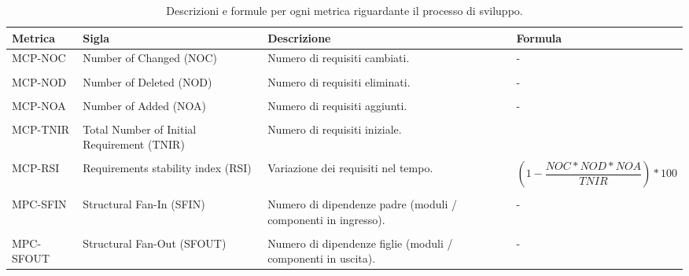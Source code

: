 \begin{table}[h]	
	\centering
	\begin{tabular}{p{2cm} p{3cm} p{5cm} p{5cm}}
		\toprule
		\textbf{Metrica}& \textbf{Sigla} & \textbf{Descrizione} & \textbf{Formula} \\
		\midrule
		MCP-NOC & Number of Changed (NOC) & Numero di requisiti cambiati. & -\\\\
		MCP-NOD & Number of Deleted (NOD) & Numero di requisiti eliminati. & -\\\\
		MCP-NOA & Number of Added (NOA) & Numero di requisiti aggiunti. & -\\\\
		MCP-TNIR & Total Number of Initial Requirement (TNIR) & Numero di requisiti iniziale.\\\\
		MCP-RSI & Requirements stability index (RSI) & Variazione dei requisiti nel tempo. & $ (1 - \dfrac{NOC * NOD * NOA}{TNIR}) * 100 $ \\\\
		MPC-SFIN & Structural Fan-In (SFIN) & Numero di dipendenze padre (moduli / componenti in ingresso). & - \\\\
		MPC-SFOUT & Structural Fan-Out (SFOUT) & Numero di dipendenze figlie (moduli / componenti in uscita). & - \\
		\bottomrule
	\end{tabular}
	\caption{Descrizioni e formule per ogni metrica riguardante il processo di sviluppo.}
	\label{table:Tabella metriche con formule per il processo di sviluppo.}
\end{table}
\clearpage
{}

